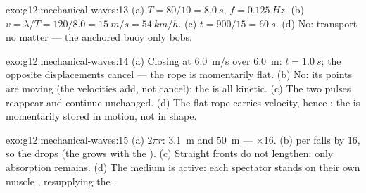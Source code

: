 \begin{solution}{exo:g12:mechanical-waves:13}
(a) $T = 80/10 = \qty{8.0}{s}$, $f = \qty{0.125}{Hz}$.
(b) $v = \lambda/T = 120/8.0 = \qty{15}{m/s} = \qty{54}{km/h}$.
(c) $t = 900/15 = \qty{60}{s}$. (d) No:  transport no matter ---
the anchored buoy only bobs.
\end{solution}

\begin{solution}{exo:g12:mechanical-waves:14}
(a) Closing at \qty{6.0}{m/s} over \qty{6.0}{m}: $t = \qty{1.0}{s}$;
the opposite displacements cancel --- the rope is momentarily flat.
(b) No: its points are moving (the  velocities add, not
cancel); the  is all kinetic. (c) The two pulses reappear and
continue unchanged. (d) The flat rope carries velocity, hence :
the  is momentarily stored in motion, not in shape.
\end{solution}

\begin{solution}{exo:g12:mechanical-waves:15}
(a) $2\pi r$: \qty{3.1}{m} and \qty{50}{m} --- $\times 16$.
(b)  per  falls by $16$, so the  drops (the
 grows with the ). (c) Straight fronts do not
lengthen: only absorption remains. (d) The medium is active: each
spectator stands on their own muscle , resupplying the .
\end{solution}


